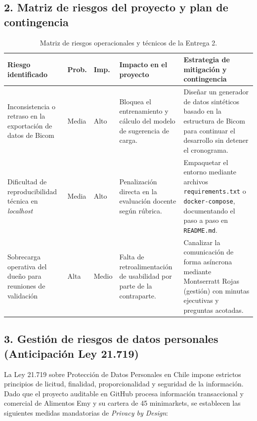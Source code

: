 \documentclass[10pt,a4paper]{article}
\begin{document}
\subsection*{2. Matriz de riesgos del proyecto y plan de contingencia}

\begin{table}[H]
\centering
\small
\begin{tabular}{p{3.2cm} p{1.2cm} p{1.2cm} p{4.5cm} p{4.5cm}}
\toprule
\textbf{Riesgo identificado} & \textbf{Prob.} & \textbf{Imp.} & \textbf{Impacto en el proyecto} & \textbf{Estrategia de mitigación y contingencia} \\
\midrule
Inconsistencia o retraso en la exportación de datos de Bicom & Media & Alto & Bloquea el entrenamiento y cálculo del modelo de sugerencia de carga. & Diseñar un generador de datos sintéticos basado en la estructura de Bicom para continuar el desarrollo sin detener el cronograma. \\
\midrule
Dificultad de reproducibilidad técnica en \textit{localhost} & Media & Alto & Penalización directa en la evaluación docente según rúbrica. & Empaquetar el entorno mediante archivos \texttt{requirements.txt} o \texttt{docker-compose}, documentando el paso a paso en \texttt{README.md}. \\
\midrule
Sobrecarga operativa del dueño para reuniones de validación & Alta & Medio & Falta de retroalimentación de usabilidad por parte de la contraparte. & Canalizar la comunicación de forma asíncrona mediante Montserratt Rojas (gestión) con minutas ejecutivas y preguntas acotadas. \\
\bottomrule
\end{tabular}
\caption{Matriz de riesgos operacionales y técnicos de la Entrega 2.}
\label{tab:riesgos-e2}
\end{table}

\subsection*{3. Gestión de riesgos de datos personales (Anticipación Ley 21.719)}

La Ley 21.719 sobre Protección de Datos Personales en Chile impone estrictos principios de licitud, finalidad, proporcionalidad y seguridad de la información. Dado que el proyecto auditable en GitHub procesa información transaccional y comercial de Alimentos Emy y su cartera de 45 minimarkets, se establecen las siguientes medidas mandatorias de \textit{Privacy by Design}:
\end{document}
